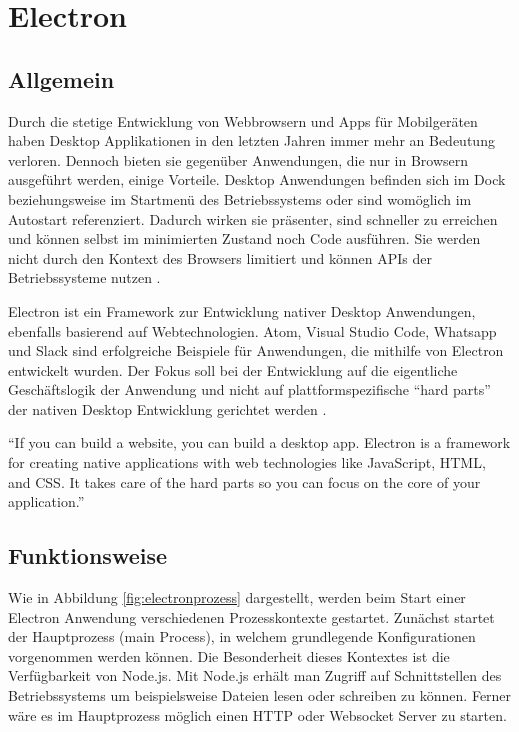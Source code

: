 \section{Electron}
\subsection{Allgemein}

Durch die stetige Entwicklung von Webbrowsern und Apps für Mobilgeräten haben Desktop Applikationen in den letzten Jahren immer mehr an Bedeutung verloren.
Dennoch bieten sie gegenüber Anwendungen, die nur in Browsern ausgeführt werden, einige Vorteile.
Desktop Anwendungen befinden sich im Dock beziehungsweise im Startmenü des Betriebssystems oder sind womöglich im Autostart referenziert.
Dadurch wirken sie präsenter, sind schneller zu erreichen und können selbst im minimierten Zustand noch Code ausführen.
Sie werden nicht durch den Kontext des Browsers limitiert und können APIs der Betriebssysteme nutzen \cite{Build58:online}.

Electron ist ein Framework zur Entwicklung nativer Desktop Anwendungen, ebenfalls basierend auf Webtechnologien.
Atom, Visual Studio Code, Whatsapp und Slack sind erfolgreiche Beispiele für Anwendungen, die mithilfe von Electron
entwickelt wurden.
Der Fokus soll bei der Entwicklung auf die eigentliche Geschäftslogik der Anwendung und nicht auf plattformspezifische
``hard parts'' der nativen Desktop Entwicklung gerichtet werden \cite{Elect57:online}.

\vspace{0.3cm}
``If you can build a website, you can build a desktop app. Electron is a framework for creating native applications
with web technologies like JavaScript, HTML, and CSS. It takes care of the hard parts so you can focus on the core of
your application.''
\cite{Elect57:online}

\subsection{Funktionsweise}
\label{sec:functionsweise}


Wie in Abbildung \ref{fig:electronprozess} dargestellt, werden beim Start einer
Electron Anwendung verschiedenen Prozesskontexte gestartet.
Zunächst startet der Hauptprozess (main Process), in welchem grundlegende Konfigurationen vorgenommen werden können.
Die Besonderheit dieses Kontextes ist die Verfügbarkeit von Node.js.
Mit Node.js erhält man Zugriff auf Schnittstellen des Betriebssystems um beispielsweise Dateien lesen oder schreiben zu können.
Ferner wäre es im Hauptprozess möglich einen HTTP oder Websocket Server zu starten.

